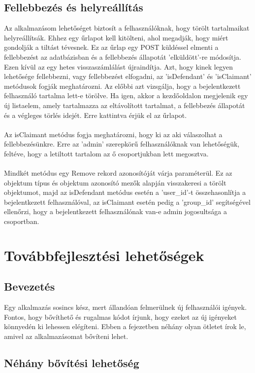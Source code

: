 \documentclass[
]{thesis-ekf}
\theoremstyle{definition}
\theoremstyle{remark}
\begin{document}
\section{Fellebbezés és helyreállítás}

Az alkalmazásom lehetőséget biztosít a felhasználóknak, hogy törölt tartalmaikat helyreállítsák. Ehhez egy űrlapot kell kitölteni, ahol megadják, hogy miért gondolják a tiltást tévesnek. Ez az űrlap egy POST küldéssel elmenti a fellebbezést az adatbázisban és a fellebbezés állapotát 'elküldött'-re módosítja. Ezen kívül az egy hetes visszaszámlálást újraindítja. Azt, hogy kinek legyen lehetősége fellebbezni, vagy fellebbezést elfogadni, az 'isDefendant' és 'isClaimant' metódusok fogják meghatározni. Az előbbi azt vizsgálja, hogy a bejelentkezett felhasználó tartalma lett-e törölve. Ha igen, akkor a kezdőoldalon megjelenik egy új listaelem, amely tartalmazza az eltávolított tartalmat, a fellebbezés állapotát és a végleges törlés idejét. Erre kattintva érjük el az űrlapot.
\\\\
Az isClaimant metódus fogja meghatározni, hogy ki az aki válaszolhat a fellebbezésünkre. Erre az 'admin' szerepkörű felhasználóknak van lehetőségük, feltéve, hogy a letiltott tartalom az ő csoportjukban lett megosztva.
\\\\
Mindkét metódus egy Remove rekord azonosítóját várja paraméterül. Ez az objektum típus és objektum azonosító mezők alapján visszakeresi a törölt objektumot, majd az isDefendant metódus esetén a 'user\_id'-t összehasonlítja a bejelentkezett felhasználóval, az isClaimant esetén pedig a 'group\_id' segítségével ellenőrzi, hogy a bejelentkezett felhasználónak van-e admin jogosultsága a csoportban. 

\chapter{Továbbfejlesztési lehetőségek}
\section{Bevezetés}
Egy alkalmazás sosincs kész, mert állandóan felmerülnek új felhasználói igények. Fontos, hogy bővíthető és rugalmas kódot írjunk, hogy ezeket az új igényeket könnyedén ki lehessen elégíteni. Ebben a fejezetben néhány olyan ötletet írok le, amivel az alkalmazásomat bővíteni lehet.

\section{Néhány bővítési lehetőség}
\end{document}
